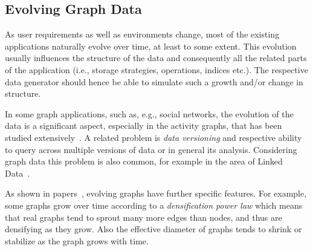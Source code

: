\subsection{Evolving Graph Data}
As user requirements as well as environments change, most of the existing
applications naturally evolve over time, at least to some extent. This evolution
usually influences the structure of the data and consequently all the related
parts of the application (i.e., storage strategies, operations, indices etc.).
The respective data generator should hence be able to simulate such a growth
and/or change in structure.

In some graph applications, such as, e.g., social networks, the evolution of the
data is a significant aspect, especially in the activity graphs, that has been
studied
extensively~\cite{doreian1997evolution,Kumar:2006:SEO:1150402.1150476,Hellmann2014583,wang2013,Kossinets88,Viswanath:2009:EUI:1592665.1592675}.
A related problem is \emph{data versioning} and respective ability to query
across multiple versions of data or in general its analysis. Considering graph
data this problem is also common, for example  in the area of Linked
Data~\cite{DBLP:conf/semweb/Papakonstantinou16,DBLP:conf/esws/MeimarisP16,fernandez2015towards,fernandez2015bear}.

As shown in
papers~\cite{Leskovec:2005:RMT:2101235.2101254,Leskovec:2005:GOT:1081870.1081893},
evolving graphs have further specific features. For example, some graphs grow
over time according to a \emph{densification power law} which means that real
graphs tend to sprout many more edges than nodes, and thus are densifying as
they grow. Also the effective diameter of graphs tends to shrink or stabilize as
the graph grows with time.



